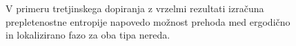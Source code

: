  \begin{figure}[H]
\caption{V primeru tretjinskega dopiranja z vrzelmi rezultati izračuna prepletenostne entropije napovedo možnost prehoda med ergodično in lokalizirano fazo za oba tipa nereda. }
\label{fig:H_ent_entro_density_9_3_3}
\end{figure} 

